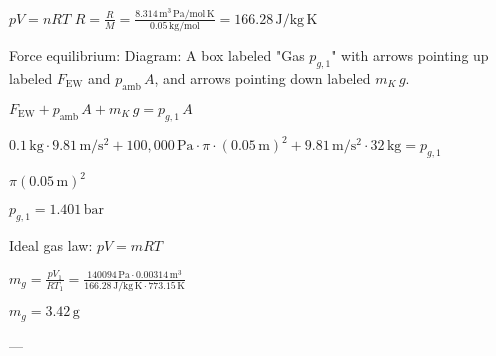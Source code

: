 \( p V = n R T \)  
\( R = \frac{R}{M} = \frac{8.314 \, \text{m}^3 \, \text{Pa}/\text{mol} \, \text{K}}{0.05 \, \text{kg}/\text{mol}} = 166.28 \, \text{J}/\text{kg} \, \text{K} \)  

Force equilibrium:  
Diagram: A box labeled "Gas \( p_{g,1} \)" with arrows pointing up labeled \( F_{\text{EW}} \) and \( p_{\text{amb}} \, A \), and arrows pointing down labeled \( m_K \, g \).  

\( F_{\text{EW}} + p_{\text{amb}} \, A + m_K \, g = p_{g,1} \, A \)  

\( 0.1 \, \text{kg} \cdot 9.81 \, \text{m}/\text{s}^2 + 100{,}000 \, \text{Pa} \cdot \pi \cdot (0.05 \, \text{m})^2 + 9.81 \, \text{m}/\text{s}^2 \cdot 32 \, \text{kg} = p_{g,1} \)  

\( \pi (0.05 \, \text{m})^2 \)  

\( p_{g,1} = 1.401 \, \text{bar} \)  

Ideal gas law:  
\( p V = m R T \)  

\( m_g = \frac{p V_1}{R T_1} = \frac{140094 \, \text{Pa} \cdot 0.00314 \, \text{m}^3}{166.28 \, \text{J}/\text{kg} \, \text{K} \cdot 773.15 \, \text{K}} \)  

\( m_g = 3.42 \, \text{g} \)  

---
